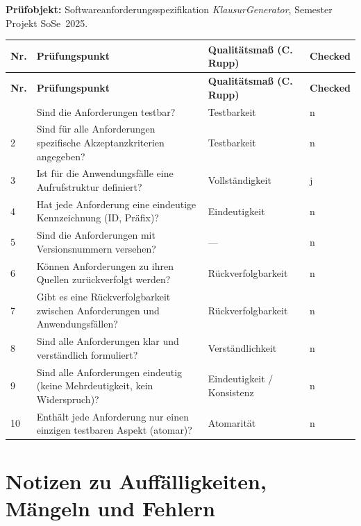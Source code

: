 \documentclass[
	fontsize=12pt,          %
	paper=a4,               %
	numbers=noenddot,       %
	listof=totoc,           %
	listof=entryprefix,     %
	listof=nochaptergap,    %
	bibliography=totoc,     %
	parskip=half,           %
	openany                 %
]{scrbook}
\begin{document}
\textbf{Prüfobjekt:} Softwareanforderungsspezifikation \emph{KlausurGenerator}, Semester Projekt SoSe~2025.

\begin{longtable}{| p{0.65cm} | p{7.0cm} | p{3.9cm} | p{1.6cm} |}
	\hline
	\textbf{Nr.} & \textbf{Prüfungspunkt} & \textbf{Qualitätsmaß (C. Rupp)} & \textbf{Checked} \\ \hline
	\endfirsthead
	\hline
	\textbf{Nr.} & \textbf{Prüfungspunkt} & \textbf{Qualitätsmaß (C. Rupp)} & \textbf{Checked} \\ \hline
	\endhead
	\hline
	\endfoot
	1  & Sind die Anforderungen testbar? & Testbarkeit & n \\ \hline
	2  & Sind für alle Anforderungen spezifische Akzeptanzkriterien angegeben? & Testbarkeit & n \\ \hline
	3  & Ist für die Anwendungsfälle eine Aufrufstruktur definiert? & Vollständigkeit & j \\ \hline
	4  & Hat jede Anforderung eine eindeutige Kennzeichnung (ID, Präfix)? & Eindeutigkeit & n \\ \hline
	5  & Sind die Anforderungen mit Versionsnummern versehen? & --- & n \\ \hline
	6  & Können Anforderungen zu ihren Quellen zurückverfolgt werden? & Rückverfolgbarkeit & n \\ \hline
	7  & Gibt es eine Rückverfolgbarkeit zwischen Anforderungen und Anwendungsfällen? & Rückverfolgbarkeit & n \\ \hline
	8  & Sind alle Anforderungen klar und verständlich formuliert? & Verständlichkeit & n \\ \hline
	9  & Sind alle Anforderungen eindeutig (keine Mehrdeutigkeit, kein Widerspruch)? & Eindeutigkeit / Konsistenz & n \\ \hline
	10 & Enthält jede Anforderung nur einen einzigen testbaren Aspekt (atomar)? & Atomarität & n \\ \hline
\end{longtable}

\section*{Notizen zu Auffälligkeiten, Mängeln und Fehlern}
\end{document}
